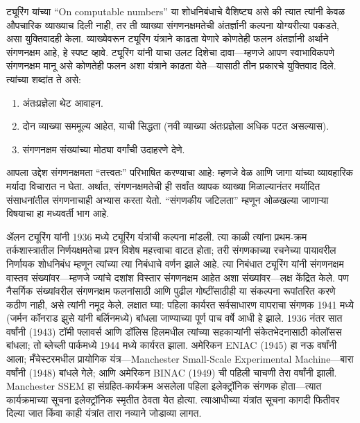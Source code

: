 \documentclass[../../../include/open-logic-section]{subfiles}
\begin{document}
\begin{digress}
ट्यूरिंग यांच्या ``On computable numbers'' या शोधनिबंधाचे वैशिष्ट्य
असे की त्यात त्यांनी केवळ औपचारिक व्याख्याच दिली नाही, तर ती व्याख्या
संगणनक्षमतेची अंतर्ज्ञानी कल्पना योग्यरीत्या पकडते, असा युक्तिवादही
केला. व्याख्येवरून ट्यूरिंग यंत्राने काढता येणारे कोणतेही फलन अंतर्ज्ञानी
अर्थाने संगणनक्षम आहे, हे स्पष्ट व्हावे. ट्यूरिंग यांनी याचा उलट
दिशेचा दावा---म्हणजे आपण स्वाभाविकपणे संगणनक्षम मानू असे कोणतेही फलन
अशा यंत्राने काढता येते---यासाठी तीन प्रकारचे युक्तिवाद दिले. त्यांच्या
शब्दांत ते असे:
\begin{enumerate}
\item अंतःप्रज्ञेला थेट आवाहन.
\item दोन व्याख्या सममूल्य आहेत, याची सिद्धता (नवी व्याख्या
  अंतःप्रज्ञेला अधिक पटत असल्यास).
\item संगणनक्षम संख्यांच्या मोठ्या वर्गांची उदाहरणे देणे.
\end{enumerate}
आपला उद्देश संगणनक्षमता ``तत्त्वतः'' परिभाषित करण्याचा आहे: म्हणजे
वेळ आणि जागा यांच्या व्यावहारिक मर्यादा विचारात न घेता. अर्थात,
संगणनक्षमतेची ही सर्वांत व्यापक व्याख्या मिळाल्यानंतर मर्यादित
संसाधनांतील संगणनाचाही अभ्यास करता येतो. ``संगणकीय जटिलता'' म्हणून
ओळखल्या जाणाऱ्या विषयाचा हा मध्यवर्ती भाग आहे.
\end{digress}

\begin{history}
ॲलन ट्यूरिंग यांनी 1936 मध्ये ट्यूरिंग यंत्रांची कल्पना मांडली.
त्या काळी त्यांना प्रथम-क्रम तर्कशास्त्रातील निर्णयक्षमतेचा प्रश्न
विशेष महत्त्वाचा वाटत होता; तरी संगणकाच्या रचनेच्या पायावरील निर्णायक
शोधनिबंध म्हणून त्यांच्या त्या निबंधाचे वर्णन झाले आहे. त्या निबंधात
ट्यूरिंग यांनी संगणनक्षम वास्तव संख्यांवर---म्हणजे ज्यांचे दशांश
विस्तार संगणनक्षम आहेत अशा संख्यांवर---लक्ष केंद्रित केले. पण
नैसर्गिक संख्यांवरील संगणनक्षम फलनांसाठी आणि पुढील गोष्टींसाठीही या
संकल्पना रूपांतरित करणे कठीण नाही, असे त्यांनी नमूद केले. लक्षात घ्या:
पहिला कार्यरत सर्वसाधारण वापराचा संगणक 1941 मध्ये (जर्मन कॉनराड
झुसे यांनी बर्लिनमध्ये) बांधला जाण्याच्या पूर्ण पाच
वर्षे आधी हे झाले. 1936 नंतर सात वर्षांनी (1943) टॉमी फ्लावर्स आणि
डॉलिस हिलमधील त्यांच्या सहकाऱ्यांनी संकेतभेदनासाठी कोलॉसस बांधला;
तो ब्लेच्ली पार्कमध्ये 1944 मध्ये कार्यरत झाला.
अमेरिकन ENIAC
(1945) हा नऊ वर्षांनी आला; मँचेस्टरमधील प्रायोगिक
यंत्र---Manchester Small-Scale Experimental Machine---बारा
वर्षांनी (1948) बांधले गेले; आणि अमेरिकन BINAC (1949) ची पहिली
चाचणी तेरा वर्षांनी झाली. Manchester SSEM हा संग्रहित-कार्यक्रम
असलेला पहिला इलेक्ट्रॉनिक संगणक होता---त्यात कार्यक्रमाच्या सूचना
इलेक्ट्रॉनिक स्मृतीत ठेवता येत होत्या. त्याआधीच्या यंत्रांत सूचना
कागदी फितीवर दिल्या जात किंवा काही यंत्रांत तारा नव्याने जोडाव्या लागत.
%
\end{history}
\end{document}
